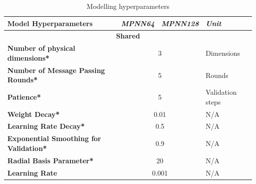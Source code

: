 \begin{table}[H]
    \centering
    \caption{Modelling hyperparameters}
    \label{tab:hyperparameters}
    \begin{tabular}{|lcll|}
        \hline
        \multicolumn{1}{|l|}{\textbf{Model Hyperparameters}}                 & \multicolumn{1}{l|}{\textit{\textbf{MPNN64}}} & \multicolumn{1}{l|}{\textit{\textbf{MPNN128}}} & \textit{\textbf{Unit}} \\ \hline
        \multicolumn{4}{|c|}{\textbf{Shared}}                                                                                                                                                          \\ \hline
        \multicolumn{1}{|l|}{\textbf{Number of physical dimensions*}}        & \multicolumn{2}{c|}{3}                        & Dimensions                                                              \\ \hline
        \multicolumn{1}{|l|}{\textbf{Number of Message Passing Rounds*}}     & \multicolumn{2}{c|}{5}                        & Rounds                                                                  \\ \hline
        \multicolumn{1}{|l|}{\textbf{Patience*}}                             & \multicolumn{2}{c|}{5}                        & Validation steps                                                        \\ \hline
        \multicolumn{1}{|l|}{\textbf{Weight Decay*}}                         & \multicolumn{2}{c|}{0.01}                     & N/A                                                                     \\ \hline
        \multicolumn{1}{|l|}{\textbf{Learning Rate Decay*}}                  & \multicolumn{2}{c|}{0.5}                      & N/A                                                                     \\ \hline
        \multicolumn{1}{|l|}{\textbf{Exponential Smoothing for Validation*}} & \multicolumn{2}{c|}{0.9}                      & N/A                                                                     \\ \hline
        \multicolumn{1}{|l|}{\textbf{Radial Basis Parameter*}}               & \multicolumn{2}{c|}{20}                       & N/A                                                                     \\ \hline
        \multicolumn{1}{|l|}{\textbf{Learning Rate}}                         & \multicolumn{2}{c|}{0.001}                    & N/A                                                                     \\ \hline

\end{tabular}
\end{table}
